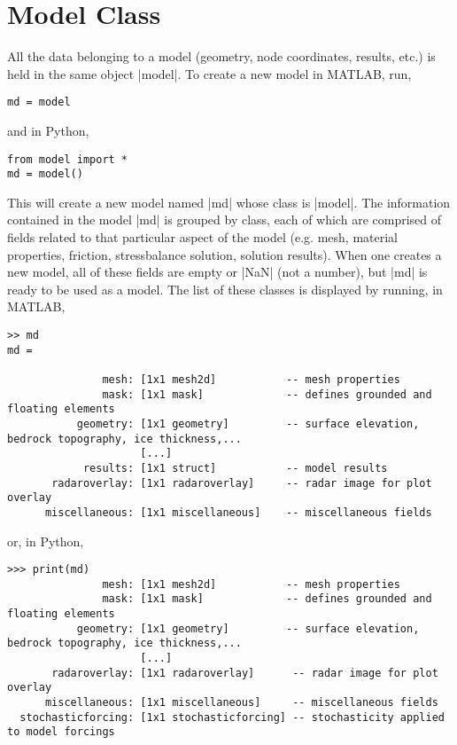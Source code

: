 
\section{Model Class} \label{sec:getting-started-model-class}
All the data belonging to a model (geometry, node coordinates, results, etc.) is held in the same object \lstinlinebg|model|. To create a new model in MATLAB, run,
\begin{lstlisting}
md = model
\end{lstlisting}
and in Python,
\begin{lstlisting}
from model import *
md = model()
\end{lstlisting}
This will create a new model named \lstinlinebg|md| whose class is \lstinlinebg|model|. The information contained in the model \lstinlinebg|md| is grouped by class, each of which are comprised of fields related to that particular aspect of the model (e.g. mesh, material properties, friction, stressbalance solution, solution results). When one creates a new model, all of these fields are empty or \lstinlinebg|NaN| (not a number), but \lstinlinebg|md| is ready to be used as a model. The list of these classes is displayed by running, in MATLAB,

\begin{lstlisting}
>> md
md = 

               mesh: [1x1 mesh2d]           -- mesh properties
               mask: [1x1 mask]             -- defines grounded and floating elements
           geometry: [1x1 geometry]         -- surface elevation, bedrock topography, ice thickness,...
                     [...]
            results: [1x1 struct]           -- model results
       radaroverlay: [1x1 radaroverlay]     -- radar image for plot overlay
      miscellaneous: [1x1 miscellaneous]    -- miscellaneous fields
\end{lstlisting}
or, in Python,
\begin{lstlisting}
>>> print(md)
               mesh: [1x1 mesh2d]           -- mesh properties
               mask: [1x1 mask]             -- defines grounded and floating elements
           geometry: [1x1 geometry]         -- surface elevation, bedrock topography, ice thickness,...
                     [...]
       radaroverlay: [1x1 radaroverlay]      -- radar image for plot overlay
      miscellaneous: [1x1 miscellaneous]     -- miscellaneous fields
  stochasticforcing: [1x1 stochasticforcing] -- stochasticity applied to model forcings
\end{lstlisting}

